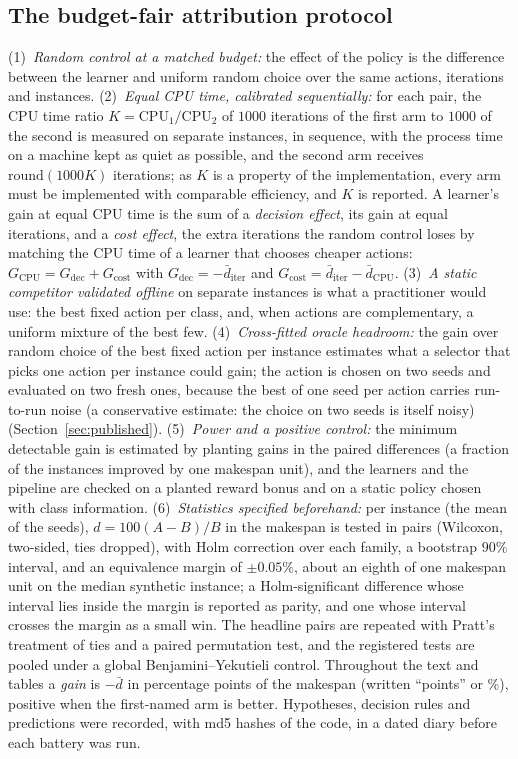 \documentclass[conference,a4paper]{IEEEtran}
\begin{document}
\subsection{The budget-fair attribution protocol}
\label{sec:protocol}
(1)~\emph{Random control at a matched budget:} the effect of the policy is the difference between the learner and uniform random choice over the same actions, iterations and instances.
(2)~\emph{Equal CPU time, calibrated sequentially:} for each pair, the CPU time ratio $K=\mathrm{CPU}_1/\mathrm{CPU}_2$ of $1000$ iterations of the first arm to $1000$ of the second is measured on separate instances, in sequence, with the process time on a machine kept as quiet as possible, and the second arm receives $\mathrm{round}(1000K)$ iterations; as $K$ is a property of the implementation, every arm must be implemented with comparable efficiency, and $K$ is reported. A learner's gain at equal CPU time is the sum of a
\emph{decision effect}, its gain at equal iterations, and a \emph{cost effect}, the extra iterations the random control loses by matching the CPU time of a learner that chooses cheaper actions: $G_{\mathrm{CPU}}=G_{\mathrm{dec}}+G_{\mathrm{cost}}$ with
$G_{\mathrm{dec}}=-\bar d_{\mathrm{iter}}$ and $G_{\mathrm{cost}}=\bar d_{\mathrm{iter}}-\bar d_{\mathrm{CPU}}$.
(3)~\emph{A static competitor validated offline} on separate instances is what a practitioner would use: the best fixed action per class, and, when actions are complementary, a uniform mixture of the best few. (4)~\emph{Cross-fitted oracle headroom:} the gain over random
choice of the best fixed action per instance estimates what a selector that picks one action per instance could gain; the action is chosen on two seeds and evaluated on two fresh ones, because the best of one seed per action carries run-to-run noise (a conservative estimate: the choice on two seeds is itself noisy) (Section~\ref{sec:published}). (5)~\emph{Power and a positive control:} the minimum detectable gain is estimated by planting gains in the paired differences (a fraction of the instances improved by one makespan unit),
and the learners and the pipeline are checked on a planted reward bonus and on a static policy chosen with class information. (6)~\emph{Statistics specified beforehand:} per instance (the mean of the seeds), $d=100(A-B)/B$ in the makespan is tested in pairs
(Wilcoxon, two-sided, ties dropped), with Holm correction over each family, a bootstrap $90\%$ interval, and an equivalence margin of $\pm0.05\%$, about an eighth of one makespan unit on the median synthetic instance; a Holm-significant difference whose interval lies inside
the margin is reported as parity, and one whose interval crosses the margin as a small win. The headline pairs are repeated with Pratt's treatment of ties and a paired permutation test, and the registered tests are pooled under a global Benjamini--Yekutieli control. Throughout the text and tables a \emph{gain} is $-\bar d$ in percentage points of the makespan (written ``points'' or $\%$), positive when the first-named arm is better. Hypotheses, decision rules and predictions were recorded, with md5 hashes of the code, in a dated diary before each battery was run.
\end{document}
